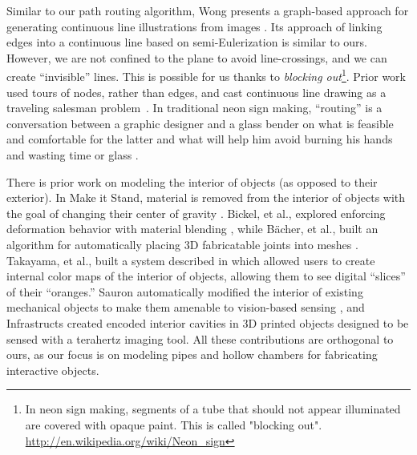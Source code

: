 Similar to our path routing algorithm, Wong presents a graph-based approach for generating continuous line illustrations from images \cite{Wong-continuousline}. Its approach of linking edges into a continuous line based on semi-Eulerization is similar to ours.  However, we are not confined to the plane to avoid line-crossings, and we can create ``invisible'' lines.  This is possible for us thanks to \emph{blocking out}\footnote{In neon sign making, segments of a tube that should not appear illuminated are covered with opaque paint. This is called "blocking out". \url{http://en.wikipedia.org/wiki/Neon_sign}}. Prior work used tours of nodes, rather than edges, and cast continuous line drawing as a traveling salesman problem~\cite{Bosch-tsp}. In traditional neon sign making, ``routing'' is a conversation between a graphic designer and a glass bender on what is feasible and comfortable for the latter and what will help him avoid burning his hands and wasting time or glass \cite{strattman1997neon}.

There is prior work on modeling the interior of objects (as opposed to their exterior).  In Make it Stand, material is removed from the interior of objects with the goal of changing their center of gravity \cite{Prevost-makeitstand}.  Bickel, et al., explored enforcing deformation behavior with material blending \cite{Bickel-deformation}, while B\"{a}cher, et al., built an algorithm for automatically placing 3D fabricatable joints into meshes \cite{Bacher-articulated}.  Takayama, et al., built a system described in \cite{Takayama-fruit} which allowed users to create internal color maps of the interior of objects, allowing them to see digital ``slices'' of their ``oranges.''  Sauron automatically modified the interior of existing mechanical objects to make them amenable to vision-based sensing \cite{Savage-sauron}, and Infrastructs created encoded interior cavities in 3D printed objects designed to be sensed with a terahertz imaging tool.  All these contributions are orthogonal to ours, as our focus is on modeling pipes and hollow chambers for fabricating interactive objects.   